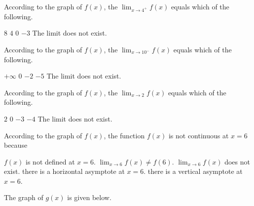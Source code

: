 \documentclass[11pt]{article}
\begin{document}
\begin{questions}
\begin{multiplechoice}{5}

\question According to the graph of $f(x)$, the $\lim_{x\to 4^+}f(x) $ equals which of the following.
\begin{answers}{3}
\ans $8$
\ans $4$
\ans $0$
\ans $-3$
\ans The limit does not exist.
\end{answers}



\question According to the graph of $f(x)$, the $\lim_{x\to 10^-}f(x) $ equals which of the following.
\begin{answers}{3}
\ans $+\infty$
\ans $0$
\ans $-2$
\ans $-5$
\ans The limit does not exist.
\end{answers}


\question According to the graph of $f(x)$, the $\lim_{x\to 2}f(x) $ equals which of the following.
\begin{answers}{3}
\ans $2$
\ans $0$
\ans $-3$
\ans $-4$
\ans The limit does not exist.
\end{answers}





\question According to the graph of $f(x)$, the function $f(x)$ is not continuous at $x=6$ because
\begin{answers}{3}
\ans $f(x)$ is not defined at $x=6$.
\ans $\lim_{x\to 6}f(x) \neq f(6)$.
\ans $\lim_{x\to 6}f(x)$ does not exist.
\ans there is a horizontal asymptote at $x=6$. 
\ans there is a vertical asymptote at $x=6$.
\end{answers}



\nextpage

\question The graph of $g(x)$ is given below.\\


\end{multiplechoice}
\end{questions}
\end{document}
